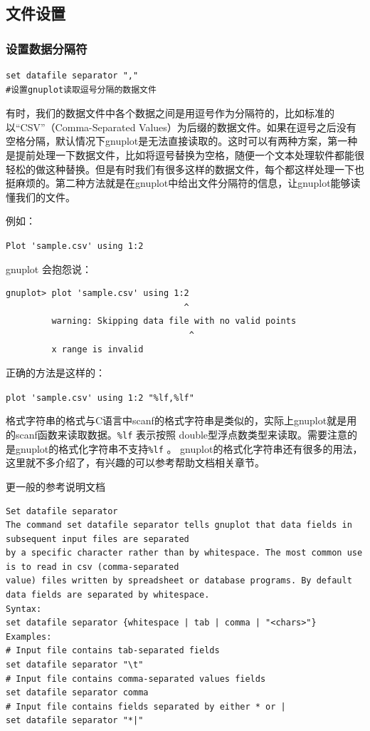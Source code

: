 \documentclass[lang=cn,10pt,newtx]{elegantbook}
\begin{document}
\subsection{文件设置}
\subsubsection{设置数据分隔符}
\begin{verbatim}
set datafile separator ","
#设置gnuplot读取逗号分隔的数据文件
\end{verbatim}

有时，我们的数据文件中各个数据之间是用逗号作为分隔符的，比如标准的以“CSV”（Comma-Separated Values）为后缀的数据文件。如果在逗号之后没有空格分隔，默认情况下gnuplot是无法直接读取的。这时可以有两种方案，第一种是提前处理一下数据文件，比如将逗号替换为空格，随便一个文本处理软件都能很轻松的做这种替换。但是有时我们有很多这样的数据文件，每个都这样处理一下也挺麻烦的。第二种方法就是在gnuplot中给出文件分隔符的信息，让gnuplot能够读懂我们的文件。

例如：

\verb*|Plot 'sample.csv' using 1:2|

gnuplot 会抱怨说：
\begin{verbatim}
gnuplot> plot 'sample.csv' using 1:2
                                   ^
         warning: Skipping data file with no valid points
                                    ^
         x range is invalid
\end{verbatim}

正确的方法是这样的：

\verb*|plot 'sample.csv' using 1:2 "%lf,%lf"|

格式字符串的格式与C语言中scanf的格式字符串是类似的，实际上gnuplot就是用的scanf函数来读取数据。\verb|%lf| 
表示按照 double型浮点数类型来读取。需要注意的是gnuplot的格式化字符串不支持\verb|%lf| 。
gnuplot的格式化字符串还有很多的用法，这里就不多介绍了，有兴趣的可以参考帮助文档相关章节。

更一般的参考说明文档
\begin{verbatim}
Set datafile separator
The command set datafile separator tells gnuplot that data fields in subsequent input files are separated
by a specific character rather than by whitespace. The most common use is to read in csv (comma-separated
value) files written by spreadsheet or database programs. By default data fields are separated by whitespace.
Syntax:
set datafile separator {whitespace | tab | comma | "<chars>"}
Examples:
# Input file contains tab-separated fields
set datafile separator "\t"
# Input file contains comma-separated values fields
set datafile separator comma
# Input file contains fields separated by either * or |
set datafile separator "*|"
\end{verbatim}
\end{document}
